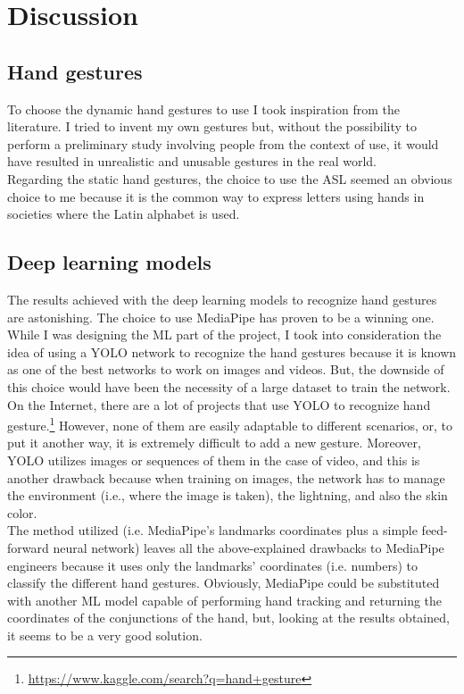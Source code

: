 \documentclass[../thesis.tex]{subfiles}
\begin{document}
\chapter{Discussion}\label{cap:discussion}

\section{Hand gestures}
To choose the dynamic hand gestures to use I took inspiration from the literature. I tried to invent my own gestures but, without the possibility to perform a preliminary study involving people from the context of use, it would have resulted in unrealistic and unusable gestures in the real world.\\

Regarding the static hand gestures, the choice to use the \acrshort{ASL} seemed an obvious choice to me because it is the common way to express letters using hands in societies where the Latin alphabet is used.

\section{Deep learning models}
The results achieved with the deep learning models to recognize hand gestures are astonishing. The choice to use MediaPipe has proven to be a winning one. While I was designing the \acrshort{ML} part of the project, I took into consideration the idea of using a YOLO network to recognize the hand gestures because it is known as one of the best networks to work on images and videos. But, the downside of this choice would have been the necessity of a large dataset to train the network. On the Internet, there are a lot of projects that use YOLO to recognize hand gesture.\footnote{\href{https://www.kaggle.com/search?q=hand+gesture}{https://www.kaggle.com/search?q=hand+gesture}} However, none of them are easily adaptable to different scenarios, or, to put it another way, it is extremely difficult to add a new gesture. Moreover, YOLO utilizes images or sequences of them in the case of video, and this is another drawback because when training on images, the network has to manage the environment (i.e., where the image is taken), the lightning, and also the skin color.\\

The method utilized (i.e. MediaPipe's landmarks coordinates plus a simple feed-forward neural network) leaves all the above-explained drawbacks to MediaPipe engineers because it uses only the landmarks' coordinates (i.e. numbers) to classify the different hand gestures. Obviously, MediaPipe could be substituted with another \acrshort{ML} model capable of performing hand tracking and returning the coordinates of the conjunctions of the hand, but, looking at the results obtained, it seems to be a very good solution.
\end{document}
